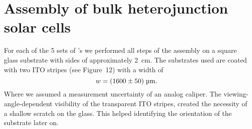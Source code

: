 \documentclass[a4paper,10pt,twocolumn]{article}
\begin{document}
\begin{extract*}
\begin{table}[h]
\begin{tabular}{@{}ccccccc@{}}
	\end{tabular}
\end{table}

\section{Assembly of bulk heterojunction solar cells}\label{sec:assembly}
For each of the 5 sets of \BHSC's we performed all steps of the assembly on a square glass substrate with sides of approximately 2~cm. The substrates used are coated with two ITO stripes (see \cite{labdesc} Figure~12) with a width of
\begin{equation*}
w = (1600\pm50)\;\text{\textmu m}.
\end{equation*}
Where we assumed a measurement uncertainty of an analog caliper. The viewing-angle-dependent visibility of the transparent ITO stripes, created the necessity of a shallow scratch on the glass. This helped identifying the orientation of the substrate later on.




\end{extract*}
\end{document}
